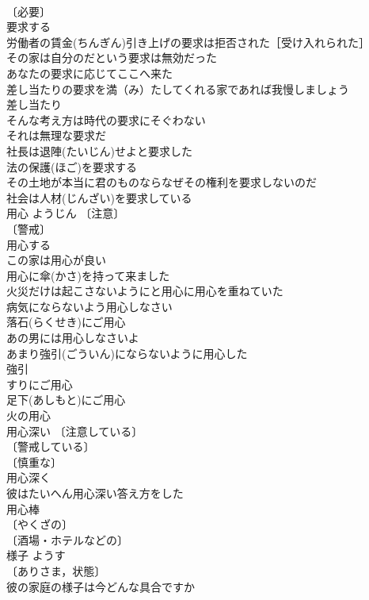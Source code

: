 \documentclass[8pt]{extreport}
\begin{document}
\begin{CJK}{UTF8}{min}
\\	〔必要〕
\\	要求する 
\\	労働者の賃金(ちんぎん)引き上げの要求は拒否された［受け入れられた］ 
\\	その家は自分のだという要求は無効だった 
\\	あなたの要求に応じてここへ来た 
\\	差し当たりの要求を満（み）たしてくれる家であれば我慢しましょう 
\\	差し当たり　
\\	そんな考え方は時代の要求にそぐわない 
\\	それは無理な要求だ 
\\	社長は退陣(たいじん)せよと要求した 
\\	法の保護(ほご)を要求する 
\\	その土地が本当に君のものならなぜその権利を要求しないのだ 
\\	社会は人材(じんざい)を要求している 
\\	用心	ようじん	〔注意〕
\\	〔警戒〕
\\	用心する 
\\	この家は用心が良い 
\\	用心に傘(かさ)を持って来ました 
\\	火災だけは起こさないようにと用心に用心を重ねていた 
\\	病気にならないよう用心しなさい 
\\	落石(らくせき)にご用心 
\\	あの男には用心しなさいよ 
\\	あまり強引(ごういん)にならないように用心した 
\\	強引　
\\	すりにご用心 
\\	足下(あしもと)にご用心 
\\	火の用心 
\\	用心深い 〔注意している〕
\\	〔警戒している〕
\\	〔慎重な〕
\\	用心深く 
\\	彼はたいへん用心深い答え方をした 
\\	用心棒 
\\	〔やくざの〕
\\	〔酒場・ホテルなどの〕
\\	様子	ようす	
\\	〔ありさま，状態〕
\\	彼の家庭の様子は今どんな具合ですか 

\end{CJK}
\end{document}
